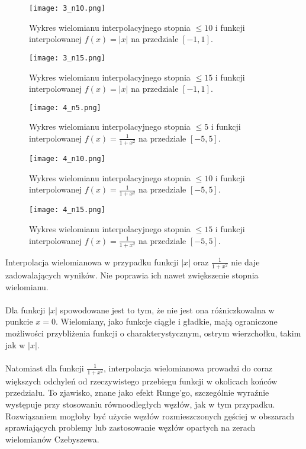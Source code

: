 \documentclass{article}
\begin{document}
\begin{figure}[H]
    \centering
    \texttt{[image: 3\_n10.png]}
    \caption{Wykres wielomianu interpolacyjnego stopnia $\leq 10$ i funkcji interpolowanej $f(x) = |x|$ na przedziale $[-1, 1]$.}
    \label{fig:zad6_f1_10}
\end{figure}

\begin{figure}[H]
    \centering
    \texttt{[image: 3\_n15.png]}
    \caption{Wykres wielomianu interpolacyjnego stopnia $\leq 15$ i funkcji interpolowanej $f(x) = |x|$ na przedziale $[-1, 1]$.}
    \label{fig:zad6_f1_15}
\end{figure}

\begin{figure}[H]
    \centering
    \texttt{[image: 4\_n5.png]}
    \caption{Wykres wielomianu interpolacyjnego stopnia $\leq 5$ i funkcji interpolowanej $f(x) = \frac{1}{1 + x^2}$ na przedziale $[-5, 5]$.}
    \label{fig:zad6_f2_5}
\end{figure}

\begin{figure}[H]
    \centering
    \texttt{[image: 4\_n10.png]}
    \caption{Wykres wielomianu interpolacyjnego stopnia $\leq 10$ i funkcji interpolowanej $f(x) = \frac{1}{1 + x^2}$ na przedziale $[-5, 5]$.}
    \label{fig:zad6_f2_10}
\end{figure}

\begin{figure}[H]
    \centering
    \texttt{[image: 4\_n15.png]}
    \caption{Wykres wielomianu interpolacyjnego stopnia $\leq 15$ i funkcji interpolowanej $f(x) = \frac{1}{1 + x^2}$ na przedziale $[-5, 5]$.}
    \label{fig:zad6_f2_15}
\end{figure}
Interpolacja wielomianowa w przypadku funkcji  \( |x| \) oraz \( \frac{1}{1+x^2} \) nie daje zadowalających wyników. Nie poprawia ich nawet zwiększenie stopnia wielomianu.
\\ \\ Dla funkcji \( |x| \) spowodowane jest to tym, że nie jest ona różniczkowalna w punkcie \( x=0 \). Wielomiany, jako funkcje ciągłe i gładkie, mają ograniczone możliwości przybliżenia funkcji o charakterystycznym, ostrym wierzchołku, takim jak w \( |x| \).  
\\ \\ Natomiast dla funkcji \( \frac{1}{1+x^2} \), interpolacja wielomianowa prowadzi do coraz większych odchyleń od rzeczywistego przebiegu funkcji w okolicach końców przedziału. To zjawisko, znane jako efekt Runge'go, szczególnie wyraźnie występuje przy stosowaniu równoodległych węzłów, jak w tym przypadku. Rozwiązaniem mogłoby być użycie węzłów rozmieszczonych gęściej w obszarach sprawiających problemy lub zastosowanie węzłów opartych na zerach wielomianów Czebyszewa.  
 
\end{document}

